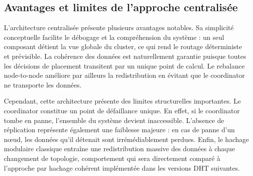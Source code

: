 \subsection{Avantages et limites de l’approche centralisée}

L'architecture centralisée présente plusieurs avantages notables. Sa simplicité conceptuelle facilite le débogage et la compréhension du système : un seul composant détient la vue globale du cluster, ce qui rend le routage déterministe et prévisible. La cohérence des données est naturellement garantie puisque toutes les décisions de placement transitent par un unique point de calcul. Le rebalance node-to-node améliore par ailleurs la redistribution en évitant que le coordinator ne transporte les données.

Cependant, cette architecture présente des limites structurelles importantes. Le coordinator constitue un point de défaillance unique. En effet, si le coordinator tombe en panne, l'ensemble du système devient inaccessible. L'absence de réplication représente également une faiblesse majeure : en cas de panne d'un nœud, les données qu'il détenait sont irrémédiablement perdues. Enfin, le hachage modulaire classique entraîne une redistribution massive des données à chaque changement de topologie, comportement qui sera directement comparé à l'approche par hachage cohérent implémentée dans les versions DHT suivantes.